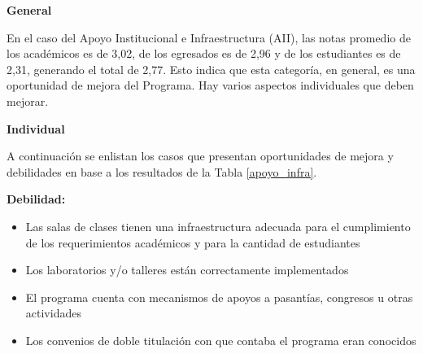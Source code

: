 \noindent\textbf{General}

En el caso del Apoyo Institucional e Infraestructura (AII), las notas promedio de los 
académicos es de 3,02, de los egresados es de 2,96 
y de los estudiantes es de 2,31, generando el total de 2,77.
Esto indica que esta categoría, en general, es una oportunidad de mejora del Programa. Hay varios aspectos individuales 
que deben mejorar. 

\noindent\textbf{Individual}

A continuación se enlistan los casos que presentan oportunidades de mejora y debilidades en base a los resultados de la Tabla \ref{apoyo_infra}.

\noindent\textbf{Debilidad:}

\begin{itemize}
\item Las salas de clases tienen una infraestructura adecuada para el cumplimiento de  los requerimientos académicos y para la cantidad de estudiantes
\item Los laboratorios y/o talleres están correctamente implementados
\item El programa cuenta con mecanismos de apoyos a pasantías, congresos u otras actividades
\item Los convenios de doble titulación con que contaba el programa eran conocidos
\end{itemize}



